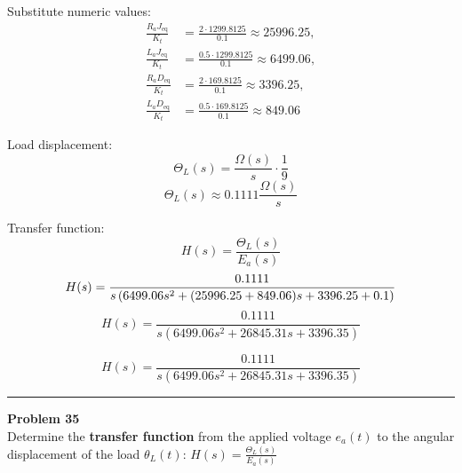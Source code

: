 Substitute numeric values:
\[
\begin{aligned}
\frac{R_a J_\mathrm{eq}}{K_t} &= \frac{2 \cdot 1299.8125}{0.1} \approx 25996.25,\\
\frac{L_a J_\mathrm{eq}}{K_t} &= \frac{0.5 \cdot 1299.8125}{0.1} \approx 6499.06,\\
\frac{R_a D_\mathrm{eq}}{K_t} &= \frac{2 \cdot 169.8125}{0.1} \approx 3396.25,\\
\frac{L_a D_\mathrm{eq}}{K_t} &= \frac{0.5 \cdot 169.8125}{0.1} \approx 849.06
\end{aligned}
\]

Load displacement:
\[
\Theta_L(s) = \frac{\Omega(s)}{s} \cdot \frac{1}{9} 
\]
\[
\Theta_L(s)\approx 0.1111 \frac{\Omega(s)}{s}
\]

Transfer function:
\[
H(s) = \frac{\Theta_L(s)}{E_a(s)} 
\]
\[
H(s) = \frac{0.1111}{s \left( 6499.06 s^2 + (25996.25 + 849.06) s + 3396.25 + 0.1 \right)}\\
\]
\[
H(s) = \frac{0.1111}{s (6499.06 s^2 + 26845.31 s + 3396.35)}
\]

\[
\boxed{H(s) = \frac{0.1111}{s (6499.06 s^2 + 26845.31 s + 3396.35)}}
\]

\newpage

\noindent\rule{\textwidth}{1pt}
\noindent\textbf{Problem 35} \hfill
\\ Determine the \textbf{transfer function} from the applied voltage $e_a(t)$ to the angular displacement of the load $\theta_L(t)$: $H(s) = \frac{\Theta_L(s)}{E_a(s)}$

